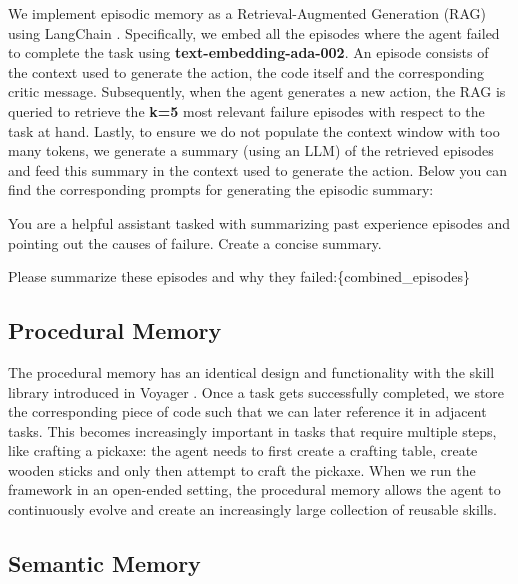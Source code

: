 We implement episodic memory as a Retrieval-Augmented Generation (RAG) using LangChain \citep{langchain2024}. Specifically, we embed all the episodes where the agent failed to complete the task using \textbf{text-embedding-ada-002}. An episode consists of the context used to generate the action, the code itself and the corresponding critic message. Subsequently, when the agent generates a new action, the RAG is queried to retrieve the \textbf{k=5} most relevant failure episodes with respect to the task at hand. Lastly, to ensure we do not populate the context window with too many tokens, we generate a summary (using an LLM) of the retrieved episodes and feed this summary in the context used to generate the action. Below you can find the corresponding prompts for generating the episodic summary:

\begin{tcolorbox}[title=System message, label=box:sys-episodic]
You are a helpful assistant tasked with summarizing past experience episodes and pointing out the causes of failure. Create a concise summary.
\end{tcolorbox}

\begin{tcolorbox}[title=Prompt message, label=box:prompt-episodic]
Please summarize these episodes and why they failed:\{combined\_episodes\}
\end{tcolorbox}

\subsection{Procedural Memory}

The procedural memory has an identical design and functionality with the skill library introduced in Voyager \citep{wang2023voyager}. Once a task gets successfully completed, we store the corresponding piece of code such that we can later reference it in adjacent tasks. This becomes increasingly important in tasks that require multiple steps, like crafting a pickaxe: the agent needs to first create a crafting table, create wooden sticks and only then attempt to craft the pickaxe. When we run the \collabvoyager framework in an open-ended setting, the procedural memory allows the agent to continuously evolve and create an increasingly large collection of reusable skills.

\subsection{Semantic Memory}

